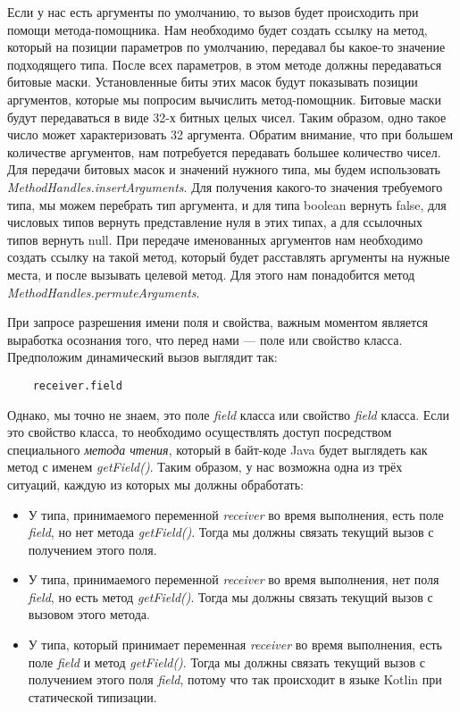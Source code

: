 Если у нас есть аргументы по умолчанию, то вызов будет происходить при помощи метода-помощника. Нам необходимо будет создать ссылку на метод, который на позиции параметров по умолчанию, передавал бы какое-то значение подходящего типа. После всех параметров, в этом методе должны передаваться битовые маски. Установленные биты этих масок будут показывать позиции
аргументов, которые мы попросим вычислить метод-помощник. Битовые маски будут передаваться в виде 32-х битных целых чисел. Таким образом, одно такое число может характеризовать 32 аргумента. Обратим внимание, что при большем количестве аргументов, нам потребуется передавать большее количество чисел. Для передачи битовых масок и значений нужного типа, мы будем использовать \textit{MethodHandles.insertArguments}. Для получения какого-то значения требуемого типа, мы можем перебрать тип аргумента, и для типа boolean вернуть false, для числовых типов вернуть представление нуля в этих типах, а для ссылочных типов вернуть null.
При передаче именованных аргументов нам необходимо создать ссылку на такой метод, который будет расставлять аргументы на нужные места, и после вызывать целевой метод. Для этого нам понадобится метод \textit{MethodHandles.permuteArguments}.

При запросе разрешения имени поля и свойства, важным моментом является выработка осознания того, что перед нами --- поле или свойство класса. Предположим динамический вызов выглядит так:

\begin{verbatim}
    receiver.field
\end{verbatim}

Однако, мы точно не знаем, это поле \textit{field} класса или свойство \textit{field} класса. Если это свойство класса, то необходимо осуществлять доступ посредством специального \textit{метода чтения}, который в байт-коде Java будет выглядеть как метод с именем \textit{getField()}. Таким образом, у нас возможна одна из трёх ситуаций, каждую из которых мы должны обработать:

\begin{itemize}
    \item У типа, принимаемого переменной  \textit{receiver} во время выполнения, есть поле \textit{field}, но нет метода \textit{getField()}. Тогда мы должны связать текущий вызов с получением этого поля.
    \item У типа, принимаемого переменной \textit{receiver} во время выполнения, нет поля \textit{field}, но есть метод \textit{getField()}. Тогда мы должны связать текущий вызов с вызовом этого метода.
    \item У типа, который принимает переменная \textit{receiver} во время выполнения, есть поле \textit{field} и метод \textit{getField()}. Тогда мы должны связать текущий вызов с получением этого поля \textit{field}, потому что так происходит в языке Kotlin при статической типизации.
\end{itemize}







